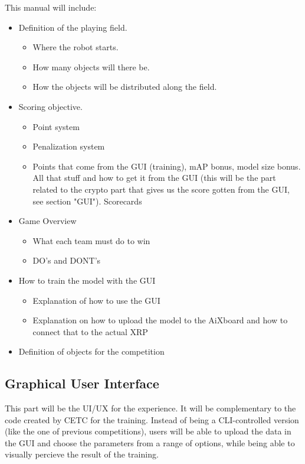 \documentclass[a4]{article}
\begin{document}
This manual will include:
\begin{itemize}
    \item Definition of the playing field.
    \begin{itemize}
        \item Where the robot starts.
        \item How many objects will there be.
        \item How the objects will be distributed along the field.
    \end{itemize}
    \item Scoring objective.
    \begin{itemize}
        \item Point system
        \item Penalization system
        \item Points that come from the GUI (training), mAP bonus, model size bonus. All that stuff and how to get it from the GUI (this will be the part related to the crypto part that gives us the score gotten from the GUI, see section "GUI").  
        \iten Scorecards
    \end{itemize}
    \item Game Overview
    \begin{itemize}
        \item What each team must do to win
        \item DO's and DONT's
    \end{itemize}
    \item How to train the model with the GUI
    \begin{itemize}
        \item Explanation of how to use the GUI
        \item Explanation on how to upload the model to the AiXboard and how to connect that to the actual XRP
    \end{itemize} 
    \item Definition of objects for the competition
\end{itemize}

\subsection*{Graphical User Interface}

This part will be the UI/UX for the experience. It will be complementary to the code created by CETC for the training. Instead of being a CLI-controlled version (like the one of previous competitions), users will be able to upload the data in the GUI and choose the parameters from a range of options, while being able to visually percieve the result of the training. 
\end{document}
